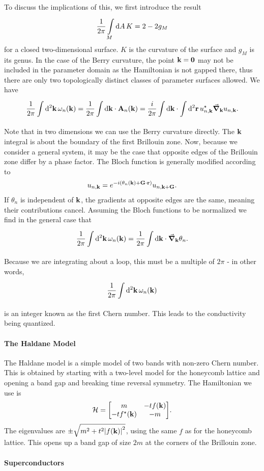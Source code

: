 To discuss the implications of this, we first introduce the result
\begin{align*}
	\frac{1}{2\pi}\int\limits_{M}^{}\dd{A}K = 2 - 2g_{M}
\end{align*}
for a closed two-dimensional surface. $K$ is the curvature of the surface and $g_{M}$ is its genus. In the case of the Berry curvature, the point $\vb{k} = \vb{0}$ may not be included in the parameter domain as the Hamiltonian is not gapped there, thus there are only two topologically distinct classes of parameter surfaces allowed. We have
\begin{align*}
	\frac{1}{2\pi}\int\limits_{}^{}\dd[2]{\vb{k}}\omega_{n}(\vb{k}) = \frac{1}{2\pi}\int\limits_{}^{}\dd{\vb{k}}\cdot\vb{A}_{n}(\vb{k}) = \frac{i}{2\pi}\int\limits_{}^{}\dd{\vb{k}}\cdot\int\limits_{}^{}\dd[2]{\vb{r}}u_{n, \vb{k}}^{\star}\grad_{\vb{k}}u_{n, \vb{k}}.
\end{align*}
Note that in two dimensions we can use the Berry curvature directly. The $\vb{k}$ integral is about the boundary of the first Brillouin zone. Now, because we consider a general system, it may be the case that opposite edges of the Brillouin zone differ by a phase factor. The Bloch function is generally modified according to
\begin{align*}
	u_{n, \vb{k}} = e^{-i(\theta_{n}(\vb{k}) + \vb{G}\cdot\vb{r})}u_{n, \vb{k} + \vb{G}}.
\end{align*}
If $\theta_{n}$ is independent of $\vb{k}$, the gradients at opposite edges are the same, meaning their contributions cancel. Assuming the Bloch functions to be normalized we find in the general case that
\begin{align*}
	\frac{1}{2\pi}\int\limits_{}^{}\dd[2]{\vb{k}}\omega_{n}(\vb{k}) = \frac{1}{2\pi}\int\limits_{}^{}\dd{\vb{k}}\cdot\grad_{\vb{k}}\theta_{n}.
\end{align*}
Because we are integrating about a loop, this must be a multiple of $2\pi$ - in other words,
\begin{align*}
	\frac{1}{2\pi}\int\limits_{}^{}\dd[2]{\vb{k}}\omega_{n}(\vb{k})
\end{align*}
is an integer known as the first Chern number. This leads to the conductivity being quantized.

\paragraph{The Haldane Model}
The Haldane model is a simple model of two bands with non-zero Chern number. This is obtained by starting with a two-level model for the honeycomb lattice and opening a band gap and breaking time reversal symmetry. The Hamiltonian we use is
\begin{align*}
	\ham = \mqty[
		m              & -tf(\vb{k}) \\
		-tf\cc(\vb{k}) & -m
	].
\end{align*}
The eigenvalues are $\pm\sqrt{m^{2} + t^{2}\abs{f(\vb{k})}^{2}}$, using the same $f$ as for the honeycomb lattice. This opens up a band gap of size $2m$ at the corners of the Brillouin zone.

\paragraph{Superconductors}
